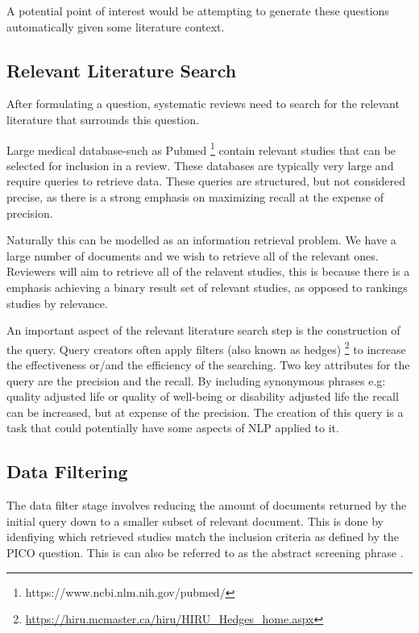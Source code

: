 A potential point of interest would be attempting to generate these questions automatically given some literature context.

\subsection{Relevant Literature Search}

After formulating a question, systematic reviews need to search for the relevant literature that surrounds this question.

Large medical database-such as Pubmed \footnote{https://www.ncbi.nlm.nih.gov/pubmed/} contain relevant studies that can be selected for inclusion in a review. These databases are typically very large and require queries to retrieve data. These queries are structured, but not considered precise, as there is a strong emphasis on maximizing recall at the expense of precision. 

Naturally this can be modelled as an information retrieval problem. We have a large number of documents and we wish to retrieve all of the relevant ones. Reviewers will aim to retrieve all of the relavent studies, this is because there is a emphasis achieving a binary result set of relevant studies, as opposed to rankings studies by relevance.  

An important aspect of the relevant literature search step is the construction of the query. Query creators often apply filters (also known as hedges) \footnote{\url{https://hiru.mcmaster.ca/hiru/HIRU_Hedges_home.aspx}} to increase the effectiveness or/and the efficiency of the searching. Two key attributes for the query are the precision and the recall. By including synonymous phrases e.g: quality adjusted life or quality of well-being or disability adjusted life the recall can be increased, but at expense of the precision. The creation of this query is a task that could potentially have some aspects of NLP applied to it.


\subsection{Data Filtering}

The data filter stage involves reducing the amount of documents returned by the initial query down to a smaller subset of relevant document. This is done by idenfiying which retrieved studies match the inclusion criteria as defined by the PICO question.  This is can also be referred to as the abstract screening phrase \cite{Kanoulas12017}.

